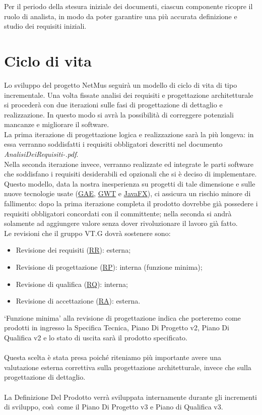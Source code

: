 Per il periodo della stesura iniziale dei documenti, ciascun
componente ricopre il ruolo di analista, in modo da poter garantire una pi\`u
accurata definizione e studio dei requisiti iniziali.

\chapter{Ciclo di vita}
\thispagestyle{fancy}
Lo sviluppo del progetto NetMus seguir\`a un modello di ciclo di vita
di tipo incrementale. Una volta fissate analisi dei
requisiti e progettazione architetturale si proceder\`a con due iterazioni sulle fasi di
progettazione di dettaglio e realizzazione. In questo modo si avr\`a la
possibilit\`a di correggere potenziali mancanze e migliorare il
software.\\
La prima iterazione di progettazione logica e realizzazione sar\`a la pi\`u
longeva: in essa verranno soddisfatti i requisiti obbligatori descritti nel
documento \emph{AnalisiDeiRequisiti-\versioneAR.pdf}.\\
Nella seconda iterazione invece, verranno realizzate ed integrate le parti
software che soddisfano i requisiti desiderabili ed opzionali che si \`e deciso
di implementare.\\

Questo modello, data la nostra inesperienza su progetti di tale dimensione e
sulle nuove tecnologie usate (\underline{GAE}, \underline{GWT} e
\underline{JavaFX}), ci assicura un rischio minore di fallimento: dopo la prima iterazione completa il prodotto dovrebbe
gi\`a possedere i requisiti obbligatori concordati con il committente; nella
seconda si andr\`a solamente ad aggiungere valore senza dover rivoluzionare il
lavoro gi\`a fatto.\\

Le revisioni che il gruppo VT.G dovr\`a sostenere sono:
\begin{itemize}
  \item Revisione dei requisiti (\underline{RR}): esterna;
  \item Revisione di progettazione (\underline{RP}): interna (funzione minima);
  \item Revisione di qualifica (\underline{RQ}): interna;
  \item Revisione di accettazione (\underline{RA}): esterna.
\end{itemize} \vspace{0.5cm}

`Funzione minima' alla revisione di progettazione indica che porteremo come
prodotti in ingresso la Specifica Tecnica, Piano Di Progetto v2, Piano Di
Qualifica v2 e lo stato di uscita sar\`a il prodotto specificato.\\
\\
Questa scelta \`e stata presa poich\'e riteniamo pi\`u importante avere una
valutazione esterna correttiva sulla progettazione architetturale, invece che
sulla progettazione di dettaglio.\\
\\
La Definizione Del Prodotto verr\`a sviluppata internamente durante gli
incrementi di sviluppo, cos\`\i\ come il Piano Di Progetto v3 e Piano di
Qualifica v3.


